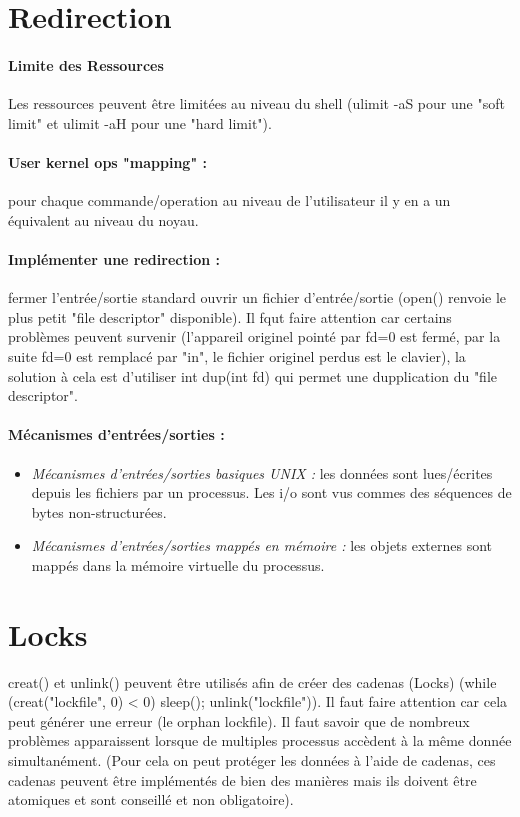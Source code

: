 \documentclass{article}[12pt]
\begin{document}
\section{Redirection}
\paragraph{Limite des Ressources} Les ressources peuvent être limitées au niveau du shell (ulimit -aS pour une "soft limit" et ulimit -aH pour une "hard limit").
\paragraph{User kernel ops "mapping" :} pour chaque commande/operation au niveau de l'utilisateur il y en a un équivalent au niveau du noyau.
\paragraph{Implémenter une redirection :} fermer l'entrée/sortie standard ouvrir un fichier d'entrée/sortie (open() renvoie le plus petit "file descriptor" disponible). Il fqut faire attention car certains problèmes peuvent survenir (l'appareil originel pointé par fd=0 est fermé, par la suite fd=0 est remplacé par "in", le fichier originel perdus est le clavier), la solution à cela est d'utiliser int dup(int fd) qui permet une dupplication du "file descriptor".
\paragraph{Mécanismes d'entrées/sorties : } 
\begin{itemize}
	\item \emph{Mécanismes d'entrées/sorties basiques UNIX : } les données sont lues/écrites depuis les fichiers par un processus. Les i/o sont vus commes des séquences de bytes non-structurées.
	\item \emph{Mécanismes d'entrées/sorties mappés en mémoire : } les objets externes sont mappés dans la mémoire virtuelle du processus.
\end{itemize} 
\section{Locks}
creat() et unlink() peuvent être utilisés afin de créer des cadenas (Locks) (while (creat("lockfile", 0) < 0) sleep(); unlink("lockfile")). Il faut faire attention car cela peut générer une erreur (le orphan lockfile). Il faut savoir que de nombreux problèmes apparaissent lorsque de multiples processus accèdent à la même donnée simultanément. (Pour cela on peut protéger les données à l'aide de cadenas, ces cadenas peuvent être implémentés de bien des manières mais ils doivent être atomiques et sont conseillé et non obligatoire).
\end{document}
